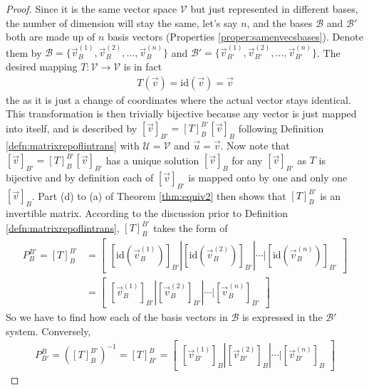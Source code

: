 \begin{proof}
Since it is the same vector space $\mathcal{V}$ but just represented in different bases, the number of dimension will stay the same, let's say $n$, and the bases $\mathcal{B}$ and $\mathcal{B}'$ both are made up of $n$ basis vectors (Properties \ref{proper:samenvecsbases}). Denote them by $\mathcal{B} = \{\vec{v}_{B}^{(1)}, \vec{v}_{B}^{(2)}, \ldots, \vec{v}_{B}^{(n)}\}$ and $\mathcal{B'} = \{\vec{v}_{B'}^{(1)}, \vec{v}_{B'}^{(2)}, \ldots, \vec{v}_{B'}^{(n)}\}$. The desired mapping $T: \mathcal{V} \to \mathcal{V}$ is in fact
\begin{align*}
T(\vec{v}) = \text{id}(\vec{v}) = \vec{v}
\end{align*}
the  as it is just a change of coordinates where the actual vector stays identical. This transformation is then trivially bijective because any vector is just mapped into itself, and is described by $[\vec{v}]_{B'} = [T]_B^{B'} [\vec{v}]_B$ following Definition \ref{defn:matrixrepoflintrans} with $\mathcal{U} = \mathcal{V}$ and $\vec{u} = \vec{v}$. Now note that $[\vec{v}]_{B'} = [T]_B^{B'} [\vec{v}]_{B'}$ has a unique solution $[\vec{v}]_B$ for any $[\vec{v}]_{B'}$ as $T$ is bijective and by definition each of $[\vec{v}]_{B'}$ is mapped onto by one and only one $[\vec{v}]_B$. Part (d) to (a) of Theorem \ref{thm:equiv2} then shows that $[T]_B^{B'}$ is an invertible matrix. According to the discussion prior to Definition \ref{defn:matrixrepoflintrans}, $[T]_B^{B'}$ takes the form of
\begin{align*}
P_B^{B'} = [T]_B^{B'} &= \begin{bmatrix}
[\text{id}(\vec{v}_{B}^{(1)})]_{B'} | [\text{id}(\vec{v}_{B}^{(2)})]_{B'} | \cdots | [\text{id}(\vec{v}_{B}^{(n)})]_{B'}
\end{bmatrix} \\
&=
\begin{bmatrix}
[\vec{v}_{B}^{(1)}]_{B'} | [\vec{v}_{B}^{(2)}]_{B'} | \cdots | [\vec{v}_{B}^{(n)}]_{B'}
\end{bmatrix}
\end{align*}
So we have to find how each of the basis vectors in $\mathcal{B}$ is expressed in the $\mathcal{B}'$ system. Conversely,
\begin{align*}
P_{B'}^B = ([T]_B^{B'})^{-1} = [T]_{B'}^B =
\begin{bmatrix}
[\vec{v}_{B'}^{(1)}]_B | [\vec{v}_{B'}^{(2)}]_B | \cdots | [\vec{v}_{B'}^{(n)}]_B

\end{bmatrix}
\end{align*}
\end{proof}

